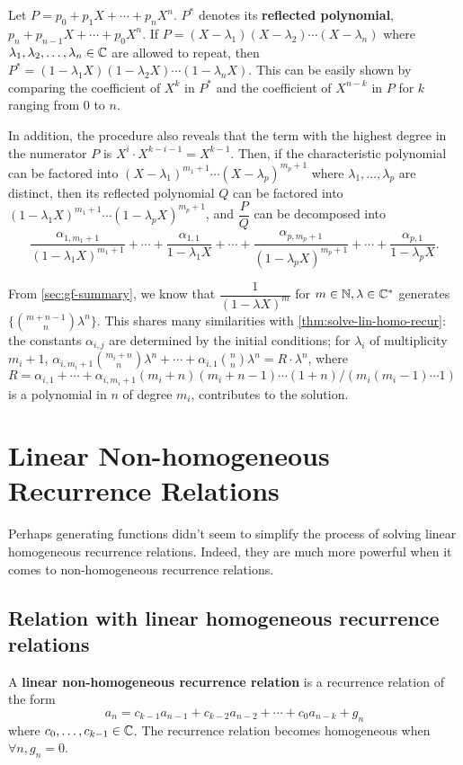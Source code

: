 \documentclass[a4paper, 12pt]{report}
\begin{document}
\begin{rem}\label{lem:roots-reflected-poly}
Let $P = p_0 + p_1 X + \cdots + p_n X^n$. $P^*$ denotes its \textbf{reflected polynomial}, $p_n + p_{n - 1} X + \cdots + p_0 X^n$. If $P = (X - \lambda_1) (X - \lambda_2) \cdots (X - \lambda_n)$ where $\lambda_1, \lambda_2, \dots, \lambda_n \in \mathbb{C}$ are allowed to repeat, then $P^* = (1 - \lambda_1 X)(1 - \lambda_2 X)\cdots(1 - \lambda_n X)$. This can be easily shown by comparing the coefficient of $X^k$ in $P^*$ and the coefficient of $X^{n - k}$ in $P$ for $k$ ranging from $0$ to $n$. 
\end{rem}

In addition, the procedure also reveals that the term with the highest degree in the numerator $P$ is $X^i \cdot X^{k - i - 1} = X^{k - 1}$. Then, if the characteristic polynomial can be factored into $(X - \lambda_1)^{m_1 + 1} \cdots (X - \lambda_p)^{m_p + 1}$ where $\lambda_1, \dots, \lambda_p$ are distinct, then its reflected polynomial $Q$ can be factored into $(1 - \lambda_1 X)^{m_1 + 1} \cdots (1 - \lambda_p X)^{m_p + 1}$, and $\dfrac{P}{Q}$ can be decomposed into
\[\frac{\alpha_{1, m_1 + 1}}{(1 - \lambda_1 X)^{m_1 + 1}} + \cdots + \frac{\alpha_{1, 1}}{1 - \lambda_1 X} + \cdots + \frac{\alpha_{p, m_p + 1}}{(1 - \lambda_p X)^{m_p + 1}} + \cdots + \frac{\alpha_{p, 1}}{1 - \lambda_p X}.\]

From \cref{sec:gf-summary}, we know that $\dfrac{1}{(1 - \lambda X)^m}$ for $m \in \mathbb{N}, \lambda \in \mathbb{C}^*$ generates $\{\binom{m + n - 1}{n} \lambda^n\}$. This shares many similarities with \cref{thm:solve-lin-homo-recur}: the constants $\alpha_{i, j}$ are determined by the initial conditions; for $\lambda_i$ of multiplicity $m_i + 1$, $\alpha_{i, m_i + 1} \binom{m_i + n}{n} \lambda^n + \cdots + \alpha_{i, 1} \binom{n}{n} \lambda^n = R \cdot \lambda^n$, where $R = \alpha_{i, 1} + \cdots + \alpha_{i, m_i + 1}(m_i + n)(m_i + n - 1)\cdots(1 + n)/(m_i(m_i - 1)\cdots1)$ is a polynomial in $n$ of degree $m_i$, contributes to the solution.

\section{Linear Non-homogeneous Recurrence Relations}Perhaps generating functions didn't seem to simplify the process of solving linear homogeneous recurrence relations. Indeed, they are much more powerful when it comes to non-homogeneous recurrence relations.

\subsection{Relation with linear homogeneous recurrence relations}
\begin{defn}
A \textbf{linear non-homogeneous recurrence relation} is a recurrence relation of the form
\[a_n = c_{k - 1}a_{n - 1} + c_{k - 2}a_{n - 2} + \cdots + c_0 a_{n - k} + g_n\]
where $c_0, \dots, c_{k - 1} \in \mathbb{C}$. The recurrence relation becomes homogeneous when $\forall n, g_n = 0$.
\end{defn}
\end{document}

